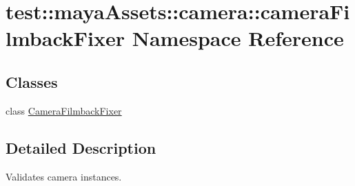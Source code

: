 \hypertarget{namespacetest_1_1mayaAssets_1_1camera_1_1cameraFilmbackFixer}{\section{test\-:\-:maya\-Assets\-:\-:camera\-:\-:camera\-Filmback\-Fixer \-Namespace \-Reference}
\label{d4/d35/namespacetest_1_1mayaAssets_1_1camera_1_1cameraFilmbackFixer}
}
\subsection*{\-Classes}
\begin{DoxyCompactItemize}
\item 
class \hyperlink{classtest_1_1mayaAssets_1_1camera_1_1cameraFilmbackFixer_1_1CameraFilmbackFixer}{\-Camera\-Filmback\-Fixer}
\end{DoxyCompactItemize}


\subsection{\-Detailed \-Description}
\begin{DoxyVerb}
Validates camera instances.
\end{DoxyVerb}
 